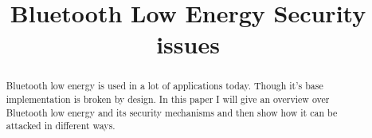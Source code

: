 \documentclass[conference]{IEEEtran}
\begin{document}
%
\title{Bluetooth Low Energy {\textendash} Security issues}


\author{
}


%








\maketitle


\begin{abstract}
Bluetooth low energy is used in a lot of applications today. Though it's base implementation is broken by design. In this paper I will give an overview over Bluetooth low energy and its security mechanisms and then show how it can be attacked in different ways.
\end{abstract}
\end{document}
